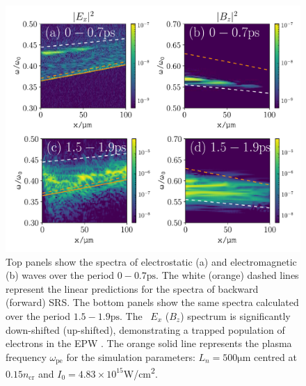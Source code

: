 \begin{figure}[h!]
    \centering
    \includegraphics[width=0.8\columnwidth]{Chapters/C4_iSRS/fig4_4a_4b_4c_4d.pdf}
    \caption{Top panels show the spectra of electrostatic (a) and electromagnetic (b) waves over the period $0-0.7\si{\pico\second}$.
    The white (orange) dashed lines represent the linear predictions for the spectra of backward (forward) SRS. The bottom panels show the same spectra calculated over the period $1.5-1.9\si{\pico\second}$. The \
$E_x$ ($B_z$)
    spectrum is significantly down-shifted (up-shifted), demonstrating a trapped population of electrons in the EPW \citep{Yin2006}.
    The orange solid line represents the plasma frequency $\omega_{\mathrm{pe}}$ for the simulation parameters: $L_n = 500 \si{\micro\metre} $ centred at $0.15n_\mathrm{cr}$ and $I_0 = 4.83\times10^{15}$\si{W/\centi\metre^2}.}
    \label{fig:downshift}
\end{figure}{}

